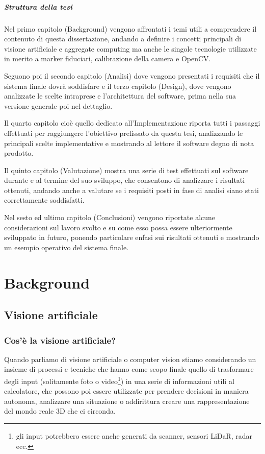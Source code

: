 \documentclass[12pt,a4paper,openright,twoside]{book}
\begin{document}
\paragraph{Struttura della tesi}

Nel primo capitolo (Background) vengono affrontati i temi utili a comprendere il contenuto di questa dissertazione, andando a definire i concetti principali di visione artificiale e aggregate computing ma anche le singole tecnologie utilizzate in merito a marker fiduciari, calibrazione della camera e OpenCV.

Seguono poi il secondo capitolo (Analisi) dove vengono presentati i requisiti che il sistema finale dovrà soddisfare e il terzo capitolo (Design), dove vengono analizzate le scelte intraprese e l'architettura del software, prima nella sua versione generale poi nel dettaglio.

Il quarto capitolo cioè quello dedicato all'Implementazione riporta tutti i passaggi effettuati per raggiungere l'obiettivo prefissato da questa tesi, analizzando le principali scelte implementative e mostrando al lettore il software degno di nota prodotto.

Il quinto capitolo (Valutazione) mostra una serie di test effettuati sul software durante e al termine del suo sviluppo, che consentono di analizzare i risultati ottenuti, andando anche a valutare se i requisiti posti in fase di analisi siano stati correttamente soddisfatti.

Nel sesto ed ultimo capitolo (Conclusioni) vengono riportate alcune considerazioni sul lavoro svolto e su come esso possa essere ulteriormente sviluppato in futuro, ponendo particolare enfasi sui risultati ottenuti e mostrando un esempio operativo del sistema finale.

\chapter{Background}

\section{Visione artificiale}

\subsection{Cos'è la visione artificiale?}
Quando parliamo di visione artificiale o computer vision stiamo considerando un insieme di processi e tecniche che hanno come scopo finale quello di trasformare degli input (solitamente foto o video\footnote{gli input potrebbero essere anche generati da scanner, sensori LiDaR, radar ecc.}) in una serie di informazioni utili al calcolatore, che possono poi essere utilizzate per prendere decisioni in maniera autonoma, analizzare una situazione o addirittura creare una rappresentazione del mondo reale 3D che ci circonda. \cite{bradski2008learning} \cite{microsoftArtificialVision}
\end{document}
